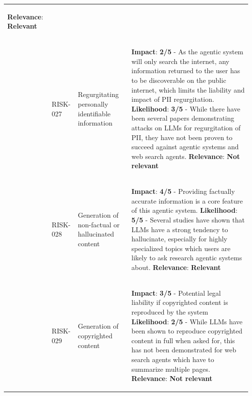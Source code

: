 \documentclass{article}
\begin{document}
\begin{longtable}{|M{0.15\textwidth}|M{0.10\textwidth}|M{0.32\textwidth}|L{0.32\textwidth}|}
\begin{flushleft}
    \newline
    \newline
    \textbf{Relevance}: \textbf{Relevant}
    \end{flushleft}
    \\ 
& RISK-027 & Regurgitating personally identifiable information &
    \begin{flushleft}
    \textbf{Impact}: \textbf{2/5} - As the agentic system will only search the internet, any information returned to the user has to be discoverable on the public internet, which limits the liability and impact of PII regurgitation.
    \newline
    \textbf{Likelihood}: \textbf{3/5} - While there have been several papers demonstrating attacks on LLMs for regurgitation of PII, they have not been proven to succeed against agentic systems and web search agents.
    \newline
    \newline
    \textbf{Relevance}: \textbf{Not relevant}
    \end{flushleft}
    \\ 
& \color{red}RISK-028 & \color{red}Generation of non-factual or hallucinated content & \color{red}
    \begin{flushleft}
    \textbf{Impact}: \textbf{4/5} - Providing factually accurate information is a core feature of this agentic system.
    \newline
    \textbf{Likelihood}: \textbf{5/5} - Several studies have shown that LLMs have a strong tendency to hallucinate, especially for highly specialized topics which users are likely to ask research agentic systems about.
    \newline
    \newline
    \textbf{Relevance}: \textbf{Relevant}
    \end{flushleft}
    \\ 
& RISK-029 & Generation of copyrighted content &
    \begin{flushleft}
    \textbf{Impact}: \textbf{3/5} - Potential legal liability if copyrighted content is reproduced by the system
    \newline
    \textbf{Likelihood}: \textbf{2/5} - While LLMs have been shown to reproduce copyrighted content in full when asked for, this has not been demonstrated for web search agents which have to summarize multiple pages.
    \newline
    \newline
    \textbf{Relevance}: \textbf{Not relevant}

\end{flushleft}
\end{longtable}
\end{document}
